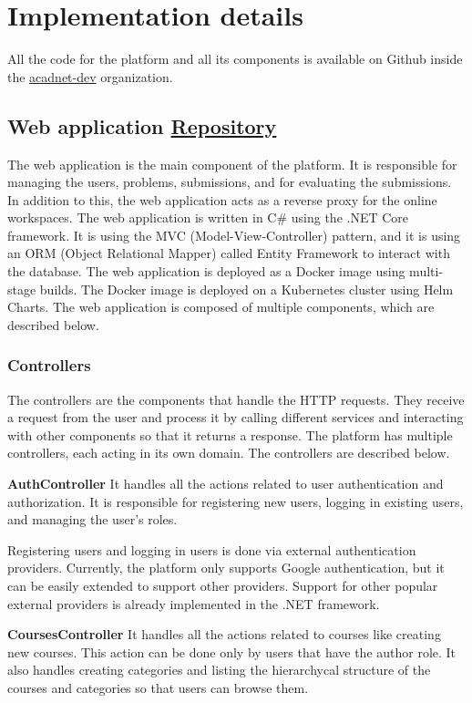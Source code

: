 \documentclass[12pt,a4paper]{report}
\begin{document}
\chapter{Implementation details}
\label{implementation-details}
All the code for the platform and all its components is available on Github inside the \href{https://github.com/acadnet-dev}{acadnet-dev} organization.

\section{Web application \href{https://github.com/acadnet-dev/web}{ Repository}}
The web application is the main component of the platform. It is responsible for managing the users, problems, submissions, and for evaluating the submissions. In addition to this, the web application acts as a reverse proxy for the online workspaces. The web application is written in C\# using the .NET Core framework. It is using the MVC (Model-View-Controller) pattern, and it is using an ORM (Object Relational Mapper) called Entity Framework to interact with the database. The web application is deployed as a Docker image using multi-stage builds. The Docker image is deployed on a Kubernetes cluster using Helm Charts. The web application is composed of multiple components, which are described below.

\subsection{Controllers}
The controllers are the components that handle the HTTP requests. They receive a request from the user and process it by calling different services and interacting with other components so that it returns a response. The platform has multiple controllers, each acting in its own domain. The controllers are described below.

\textbf{AuthController}
It handles all the actions related to user authentication and authorization. It is responsible for registering new users, logging in existing users, and managing the user's roles.

Registering users and logging in users is done via external authentication providers. Currently, the platform only supports Google authentication, but it can be easily extended to support other providers. Support for other popular external providers is already implemented in the .NET framework.

\textbf{CoursesController}
It handles all the actions related to courses like creating new courses. This action can be done only by users that have the author role. It also handles creating categories and listing the hierarchycal structure of the courses and categories so that users can browse them.
\end{document}

